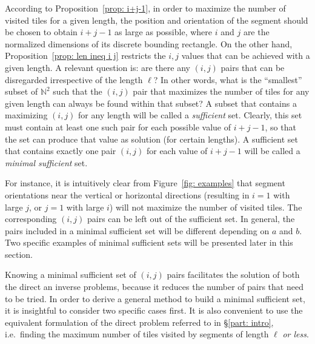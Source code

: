 \documentclass[12pt, a4paper]{article}
\newcommand{\len}{\ell} %
\begin{document}
According to Proposition~\ref{prop: i+j-1}, in order to maximize the number of visited tiles for a given length, the position and orientation of the segment should be chosen to obtain $i+j-1$ as large as possible, where $i$ and $j$ are the normalized dimensions of its discrete bounding rectangle. On the other hand, Proposition~\ref{prop: len ineq i j} restricts the $i, j$ values that can be achieved with a given length. A relevant question is: are there any $(i,j)$ pairs that can be disregarded irrespective of the length $\len$? In other words, what is the ``smallest'' subset of $\mathbb N^2$ such that the $(i,j)$ pair that maximizes the number of tiles for any given length can always be found within that subset? A subset that contains a maximizing $(i,j)$ for any length will be called a \emph{sufficient} set. Clearly, this set must contain at least one such pair for each possible value of $i+j-1$, so that the set can produce that value as solution (for certain lengths). A sufficient set that contains exactly one pair $(i,j)$ for each value of $i+j-1$ will be called a \emph{minimal sufficient} set.

For instance, it is intuitively clear from Figure~\ref{fig: examples} that segment orientations near the vertical or horizontal directions (resulting in $i=1$ with large $j$, or $j=1$ with large $i$) will not maximize the number of visited tiles.
The corresponding $(i,j)$ pairs can be left out of the sufficient set. In general, the pairs included in a minimal sufficient set will be different depending on $a$ and $b$. Two specific examples of minimal sufficient sets will be presented later in this section.



Knowing a minimal sufficient set of $(i,j)$ pairs facilitates the solution of both the direct an inverse problems, because it reduces the number of pairs that need to be tried. In order to derive a general method to build a minimal sufficient set, it is insightful to consider two specific cases first. It is also convenient to use the equivalent formulation of the direct problem referred to in \S\ref{part: intro}, i.e.~finding the maximum number of tiles visited by segments of length $\len$ \emph{or less}.
\end{document}
